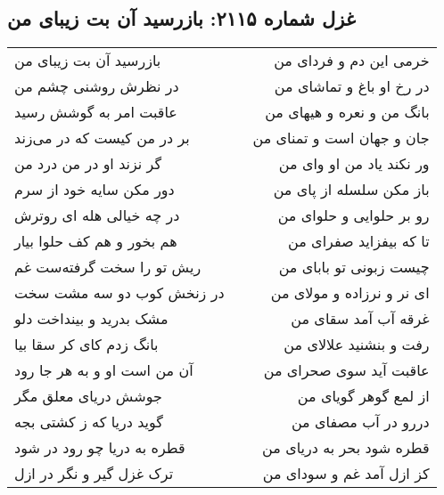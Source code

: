 \begin{center}
\section*{غزل شماره ۲۱۱۵: بازرسید آن بت زیبای من}
\label{sec:2115}
\begin{longtable}{l p{0.5cm} r}
بازرسید آن بت زیبای من
&&
خرمی این دم و فردای من
\\
در نظرش روشنی چشم من
&&
در رخ او باغ و تماشای من
\\
عاقبت امر به گوشش رسید
&&
بانگ من و نعره و هیهای من
\\
بر در من کیست که در می‌زند
&&
جان و جهان است و تمنای من
\\
گر نزند او در من درد من
&&
ور نکند یاد من او وای من
\\
دور مکن سایه خود از سرم
&&
باز مکن سلسله از پای من
\\
در چه خیالی هله ای روترش
&&
رو بر حلوایی و حلوای من
\\
هم بخور و هم کف حلوا بیار
&&
تا که بیفزاید صفرای من
\\
ریش تو را سخت گرفته‌ست غم
&&
چیست زبونی تو بابای من
\\
در زنخش کوب دو سه مشت سخت
&&
ای نر و نرزاده و مولای من
\\
مشک بدرید و بینداخت دلو
&&
غرقه آب آمد سقای من
\\
بانگ زدم کای کر سقا بیا
&&
رفت و بنشنید علالای من
\\
آن من است او و به هر جا رود
&&
عاقبت آید سوی صحرای من
\\
جوشش دریای معلق مگر
&&
از لمع گوهر گویای من
\\
گوید دریا که ز کشتی بجه
&&
دررو در آب مصفای من
\\
قطره به دریا چو رود در شود
&&
قطره شود بحر به دریای من
\\
ترک غزل گیر و نگر در ازل
&&
کز ازل آمد غم و سودای من
\\
\end{longtable}
\end{center}
